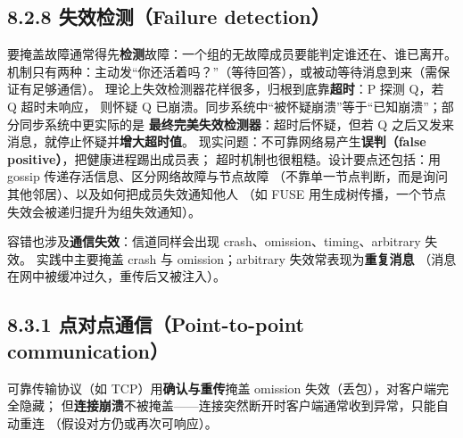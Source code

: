 \subsection*{8.2.8 失效检测（Failure detection）}
要掩盖故障通常得先\textbf{检测}故障：一个组的无故障成员要能判定谁还在、谁已离开。
机制只有两种：主动发“你还活着吗？”（等待回答），或被动等待消息到来（需保证有足够通信）。
理论上失效检测器花样很多，归根到底靠\textbf{超时}：P 探测 Q，若 Q 超时未响应，
则怀疑 Q 已崩溃。同步系统中“被怀疑崩溃”等于“已知崩溃”；部分同步系统中更实际的是
\textbf{最终完美失效检测器}：超时后怀疑，但若 Q 之后又发来消息，就停止怀疑并\textbf{增大超时值}。
现实问题：不可靠网络易产生\textbf{误判（false positive）}，把健康进程踢出成员表；
超时机制也很粗糙。设计要点还包括：用 gossip 传递存活信息、区分网络故障与节点故障
（不靠单一节点判断，而是询问其他邻居）、以及如何把成员失效通知他人
（如 FUSE 用生成树传播，一个节点失效会被递归提升为组失效通知）。

\begin{closeread}
\end{closeread}



容错也涉及\textbf{通信失效}：信道同样会出现 crash、omission、timing、arbitrary 失效。
实践中主要掩盖 crash 与 omission；arbitrary 失效常表现为\textbf{重复消息}
（消息在网中被缓冲过久，重传后又被注入）。

\subsection*{8.3.1 点对点通信（Point-to-point communication）}
可靠传输协议（如 TCP）用\textbf{确认与重传}掩盖 omission 失效（丢包），对客户端完全隐藏；
但\textbf{连接崩溃}不被掩盖——连接突然断开时客户端通常收到异常，只能自动重连
（假设对方仍或再次可响应）。

\begin{closeread}
\end{closeread}

